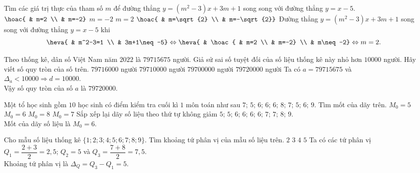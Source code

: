 \begin{ex}%
Tìm các giá trị thực của tham số $m$ để đường thẳng $y=\left(m^2-3\right)x+3m+1$ song song với đường thẳng $y=x-5$.
\choice
{$\hoac{ & m=2 \\ & m=-2}$}
{$m=-2$}
{\True $m=2$}
{$\hoac{ & m=\sqrt{2} \\ & m=-\sqrt{2}}$}
\loigiai
{
Đường thẳng $y=\left(m^2-3\right)x+3m+1$ song song với đường thẳng $y=x-5$ khi
$$\heva{ & m^2-3=1 \\ & 3m+1\neq-5} \Leftrightarrow \heva{ & \hoac{ & m=2 \\ & m=-2} \\ & m\neq-2} \Leftrightarrow m=2.$$
}
\end{ex}

\begin{ex}%
Theo thống kê, dân số Việt Nam năm $2022$ là $79715675$ người. Giả sử sai số tuyệt đối của số liệu thống kê này nhỏ hơn $10000$ người. Hãy viết số quy tròn của số trên.
\choice
{$79716000$ người}
{$79710000$ người}
{$79700000$ người}
{\True $79720000$ người}
\loigiai
{
Ta có $a=79715675$ và $\Delta_a<10000 \Rightarrow d=10000$. \\
Vậy số quy tròn của số $a$ là $79720000$.
}
\end{ex}

\begin{ex}%
Một tổ học sinh gồm $10$ học sinh có điểm kiểm tra cuối kì $1$ môn toán như sau $7$; $5$; $6$; $6$; $6$; $8$; $7$; $5$; $6$; $9$. Tìm mốt của dãy trên.
\choice
{$M_0=5$}
{\True $M_0=6$}
{$M_0=8$}
{$M_0=7$}
\loigiai
{
Sắp xếp lại dãy số liệu theo thứ tự không giảm $5$; $5$; $6$; $6$; $6$; $6$; $7$; $7$; $8$; $9$. \\
Mốt của dãy số liệu là $M_0=6$.
}
\end{ex}

\begin{ex}%
Cho mẫu số liệu thống kê $\{1;2;3;4;5;6;7;8;9\}$. Tìm khoảng tứ phân vị của mẫu số liệu trên.
\choice
{$2$}
{$3$}
{$4$}
{\True $5$}
\loigiai
{
Ta có các tứ phân vị $Q_1=\dfrac{2+3}{2}=2{,}5$; $Q_2=5$ và $Q_3=\dfrac{7+8}{2}=7{,}5$. \\
Khoảng tứ phân vị là $\Delta_Q=Q_3-Q_1=5$.
}
\end{ex}


